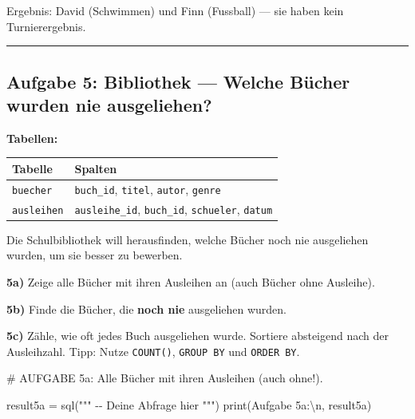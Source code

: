 \documentclass[
  nswissgerman,
  a4paper,
  DIV=11,
  numbers=noendperiod,
  ngerman]{scrreprt}
\newenvironment{Shaded}{\begin{snugshade}}{\end{snugshade}}
\newcommand{\BuiltInTok}[1]{\textcolor[rgb]{0.00,0.23,0.31}{#1}}
\newcommand{\CharTok}[1]{\textcolor[rgb]{0.13,0.47,0.30}{#1}}
\newcommand{\CommentTok}[1]{\textcolor[rgb]{0.37,0.37,0.37}{#1}}
\newcommand{\NormalTok}[1]{\textcolor[rgb]{0.00,0.23,0.31}{#1}}
\newcommand{\OperatorTok}[1]{\textcolor[rgb]{0.37,0.37,0.37}{#1}}
\newcommand{\StringTok}[1]{\textcolor[rgb]{0.13,0.47,0.30}{#1}}
\newcounter{none} %
\begin{document}
Ergebnis: David (Schwimmen) und Finn (Fussball) --- sie haben kein
Turnierergebnis.

\begin{center}\rule{0.5\linewidth}{0.5pt}\end{center}

\subsection{Aufgabe 5: Bibliothek --- Welche Bücher wurden nie
ausgeliehen?}\label{aufgabe-5-bibliothek-welche-buxfccher-wurden-nie-ausgeliehen}

\textbf{Tabellen:}

{\def\LTcaptype{none} %
\begin{longtable}[]{@{}ll@{}}
\toprule\noalign{}
Tabelle & Spalten \\
\midrule\noalign{}
\endhead
\bottomrule\noalign{}
\endlastfoot
\texttt{buecher} & \texttt{buch\_id}, \texttt{titel}, \texttt{autor},
\texttt{genre} \\
\texttt{ausleihen} & \texttt{ausleihe\_id}, \texttt{buch\_id},
\texttt{schueler}, \texttt{datum} \\
\end{longtable}
}

Die Schulbibliothek will herausfinden, welche Bücher noch nie
ausgeliehen wurden, um sie besser zu bewerben.

\textbf{5a)} Zeige alle Bücher mit ihren Ausleihen an (auch Bücher ohne
Ausleihe).

\textbf{5b)} Finde die Bücher, die \textbf{noch nie} ausgeliehen wurden.

\textbf{5c)} Zähle, wie oft jedes Buch ausgeliehen wurde. Sortiere
absteigend nach der Ausleihzahl. Tipp: Nutze \texttt{COUNT()},
\texttt{GROUP\ BY} und \texttt{ORDER\ BY}.

\begin{Shaded}
\begin{Highlighting}[numbers=left,,]
\CommentTok{\# AUFGABE 5a: Alle Bücher mit ihren Ausleihen (auch ohne!).}

\NormalTok{result5a }\OperatorTok{=}\NormalTok{ sql(}\StringTok{"""}
\StringTok{{-}{-} Deine Abfrage hier}
\StringTok{"""}\NormalTok{)}
\BuiltInTok{print}\NormalTok{(}\StringTok{\textquotesingle{}Aufgabe 5a:}\CharTok{\textbackslash{}n}\StringTok{\textquotesingle{}}\NormalTok{, result5a)}
\end{Highlighting}
\end{Shaded}
\end{document}
